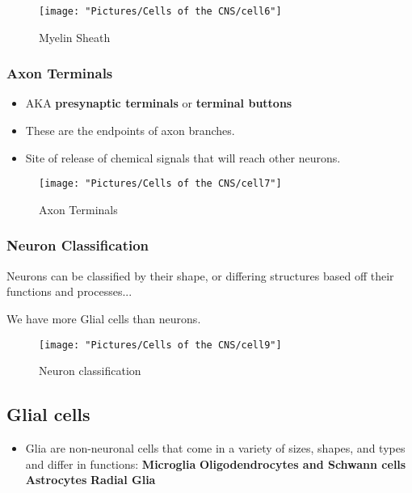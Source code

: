 \documentclass[12pt,a4paper]{article}
\begin{document}
	
\begin{figure}
	\centering
	\texttt{[image: "Pictures/Cells of the CNS/cell6"]}
	\caption{Myelin Sheath}
	\label{fig:cell6}
\end{figure}
	
	\subsubsection{Axon Terminals}
	
	\begin{itemize}
		\item AKA \textbf{presynaptic terminals} or \textbf{terminal buttons}
		\item These are the endpoints of axon branches. 
		\item Site of release of chemical signals that will reach other neurons. 
	\end{itemize}
	
	
\begin{figure}
	\centering
	\texttt{[image: "Pictures/Cells of the CNS/cell7"]}
	\caption{Axon Terminals}
	\label{fig:cell7}
\end{figure}
	
	\subsubsection{Neuron Classification}
	
	Neurons can be classified by their shape, or differing structures based off their functions and processes...
	
	We have more Glial cells than neurons. 
	
	
\begin{figure}
	\centering
	\texttt{[image: "Pictures/Cells of the CNS/cell9"]}
	\caption{Neuron classification}
	\label{fig:cell9}
\end{figure}
	
	\subsection{Glial cells}
	
	\begin{itemize}
		\item Glia are non-neuronal cells that come in a variety of sizes, shapes, and types and differ in functions:
		\subitem \textbf{Microglia}
		\subitem \textbf{Oligodendrocytes and Schwann cells}
		\subitem \textbf{Astrocytes}
		\subitem \textbf{Radial Glia}
	\end{itemize}
	
\end{document}

